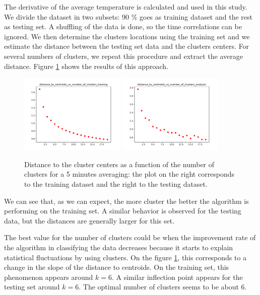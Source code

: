 \documentclass[11pt]{amsart}
\begin{document}
The derivative of the average temperature is calculated and used in this study.
We divide the dataset in two subsets: 90 \% goes as training dataset and the rest as testing set.
A shuffling of the data is done, so the time correlations can be ignored.
We then determine the clusters locations using the training set and we estimate the distance between the testing set data and the clusters centers.
For several numbers of clusters, we repeat this procedure and extract the average distance.
Figure \ref{fig:distance_to_centroids2} shows the results of this approach.
\begin{figure}
    \includegraphics[width=0.45\textwidth]{../plots/distance_to_centroids_vs_number_of_clusters_training_5.pdf}
    \includegraphics[width=0.45\textwidth]{../plots/distance_to_centroids_vs_number_of_clusters_analysis_5.pdf}
    \caption{\label{fig:distance_to_centroids2} Distance to the cluster centers as a function of the number of clusters for a 5 minutes averaging: the plot on the right corresponds to the training dataset and the right to the testing dataset.}
\end{figure}
We can see that, as we can expect, the more cluster the better the algorithm is performing on the training set.
A similar behavior is observed for the testing data, but the distances are generally larger for this set.

The best value for the number of clusters could be when the improvement rate of the algorithm in classifying the data decreases because it starts to explain statistical fluctuations by using clusters.
On the figure \ref{fig:distance_to_centroids2}, this corresponds to a change in the slope of the distance to centroids.
On the training set, this phenomenon appears around $k=6$.
A similar inflection point appears for the testing set around $k=6$.
The optimal number of clusters seems to be about 6.
\end{document}
